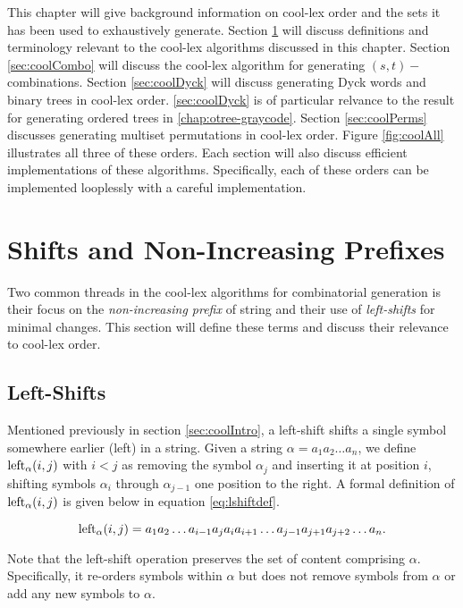This chapter will give background information on cool-lex order and the sets it has been used to exhaustively generate.  Section \ref{sec:shiftsandprefixes} will discuss definitions and terminology relevant to the cool-lex algorithms discussed in this chapter.  Section \ref{sec:coolCombo} will discuss the cool-lex algorithm for generating $(s,t)-$combinations.  Section \ref{sec:coolDyck} will discuss generating Dyck words and binary trees in cool-lex order.  \ref{sec:coolDyck} is of particular relvance to the result for generating ordered trees in \ref{chap:otree-graycode}.  Section \ref{sec:coolPerms} discusses generating multiset permutations in cool-lex order.  Figure \ref{fig:coolAll} illustrates all three of these orders. Each section will also discuss efficient implementations of these algorithms.  Specifically, each of these orders can be implemented looplessly with a careful implementation.


\section{Shifts and Non-Increasing Prefixes} \label{sec:shiftsandprefixes}
Two common threads in the cool-lex algorithms for combinatorial generation is their focus on the \emph{non-increasing prefix} of string and their use of \emph{left-shifts} for minimal changes.  This section will define these terms and discuss their relevance to cool-lex order.

\subsection{Left-Shifts}
  Mentioned previously in section \ref{sec:coolIntro}, a left-shift shifts a single symbol somewhere earlier (left) in a string.  Given a string $\alpha = a_1 a_2 \ldots a_n$, we define $\lshiftindex[\alpha]{i}{j}$ with $i < j$ as removing the symbol $\alpha_j$ and inserting it at position $i$, shifting symbols $\alpha_i$ through $\alpha_{j-1}$ one position to the right.  A formal definition of $\lshiftindex[\alpha]{i}{j}$ is given below in equation \ref{eq:lshiftdef}.

\begin{equation} \label{eq:lshiftdef}
    \lshiftindex[\alpha]{i}{j} = a_1 a_2 \ldots a_{i-1} a_j a_{i} a_{i+1} \ldots a_{j-1} a_{j+1} a_{j+2} \ldots a_n.
\end{equation}

Note that the left-shift operation preserves the set of content comprising $\alpha$.  Specifically, it re-orders symbols within $\alpha$ but does not remove symbols from $\alpha$ or add any new symbols to $\alpha$.

